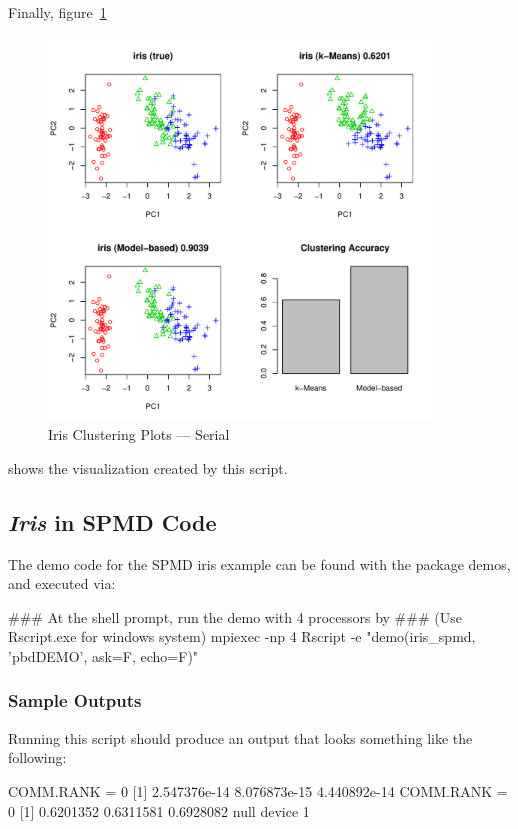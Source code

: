 Finally, figure~\ref{fig:iris_cluster_serial}
\begin{figure}[h!bt]
  \centering
  \includegraphics[width=4in]{pbdDEMO-include/pics/serial_plot.pdf}
  \caption{Iris Clustering Plots --- Serial}
  \label{fig:iris_cluster_serial}
\end{figure}
shows the visualization created by this script.








\subsection{{\it Iris} in SPMD Code}

The demo code for the SPMD iris example can be found with the package demos, and executed via:
\begin{Command}
### At the shell prompt, run the demo with 4 processors by
### (Use Rscript.exe for windows system)
mpiexec -np 4 Rscript -e "demo(iris_spmd, 'pbdDEMO', ask=F, echo=F)"
\end{Command}

\subsubsection{Sample Outputs}
Running this script should produce an output that looks something like the following:
\begin{Output}
COMM.RANK = 0
[1] 2.547376e-14 8.076873e-15 4.440892e-14
COMM.RANK = 0
[1] 0.6201352 0.6311581 0.6928082
null device 
          1 
\end{Output}

